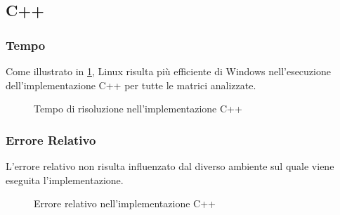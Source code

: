 \documentclass[11pt,italian]{article}
\begin{document}
\subsection{C++}
\subsubsection*{Tempo}
Come illustrato in \cref{fig:cpp-time}, Linux risulta più efficiente di Windows nell'esecuzione dell'implementazione C++ per tutte le matrici analizzate.
\begin{figure}[H]
    \caption{Tempo di risoluzione nell'implementazione C++}
    \label{fig:cpp-time}
\end{figure}

\subsubsection*{Errore Relativo}
L'errore relativo non risulta influenzato dal diverso ambiente sul quale viene eseguita l'implementazione.
\begin{figure}[H]
    \caption{Errore relativo nell'implementazione C++}
    \label{fig:cpp-error}
\end{figure}
\end{document}
